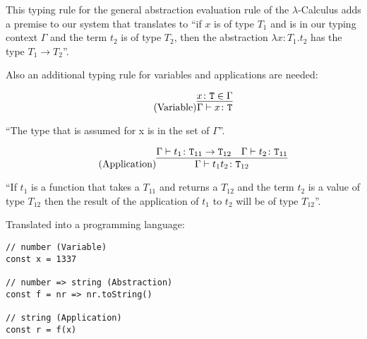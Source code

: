 This typing rule for the general abstraction evaluation rule
of the $\lambda$-Calculus  adds
a premise to our system that translates to ``if $x$ is of
type $T_1$ and is in our typing context $\Gamma$ and
the term $t_2$ is of type $T_2$, then the abstraction
$\lambda x \colon T_1 . t_2$ has the type $T_1 \rightarrow T_2$''.

Also an additional typing rule for variables and applications
are needed:

\begin{equation*}
    \tag{Variable}
    \infer{
        \Gamma \vdash x \colon \texttt{T}
    }{
        x \colon \texttt{T} \in \Gamma
    }
\end{equation*}

``The type that is assumed for x is in the set of $\Gamma$''.

\begin{equation*}
    \tag{Application}
    \infer{
        \Gamma \vdash t_1 t_2 \colon \texttt{T}_{12}
    }{
        \Gamma \vdash t_1 \colon \texttt{T}_{11} \rightarrow \texttt{T}_{12}
        &
        \Gamma \vdash t_2 \colon \texttt{T}_{11}
    }
\end{equation*}

``If $t_1$ is a function that takes a $T_{11}$ and returns a
$T_{12}$ and the term $t_2$ is a value of type $T_{12}$ then
the result of the application of $t_1$ to $t_2$ will
be of type $T_{12}$''.

Translated into a programming language:

\begin{lstlisting}[style=JavaScript]
// number (Variable)
const x = 1337

// number => string (Abstraction)
const f = nr => nr.toString()

// string (Application)
const r = f(x)
\end{lstlisting}
